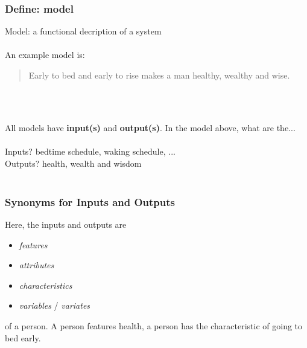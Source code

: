 \documentclass[handout]{beamer}
\begin{document}
\begin{frame}\frametitle{Define: model}

Model: a functional decription of a system  \pause \\~\\ An example model is:

\begin{quotation}
Early to bed and early to rise makes a man healthy, wealthy and wise. \pause 
\end{quotation}

 \\~\\  \pause 

All models have \textbf{input(s)} and \textbf{output(s)}. In the model above, what are the... \\~\\

Inputs? \pause bedtime schedule, waking schedule, ... \\
Outputs? \pause health, wealth and wisdom \\~\\

\end{frame}


\begin{frame}\frametitle{Synonyms for Inputs and Outputs}

\small
Here, the inputs and outputs are 

\begin{itemize}
\item \textit{features} 
\item \textit{attributes} 
\item \textit{characteristics}
\item \textit{variables} / \textit{variates}
\end{itemize}

of a person.  \pause A person features health, a person has the characteristic of going to bed early. 


\end{frame}
\end{document}
